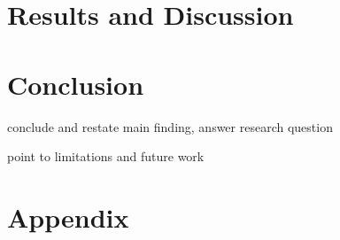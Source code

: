 \documentclass[
10pt, %
a4paper, %
oneside, %
headinclude,footinclude, %
] {book}%
\begin{document}
\chapter{Results and Discussion}


\chapter{Conclusion}
\label{conclusion}

conclude and restate main finding, answer research question

point to limitations and future work





 



\newpage
\appendix
\chapter{Appendix}
\end{document}

